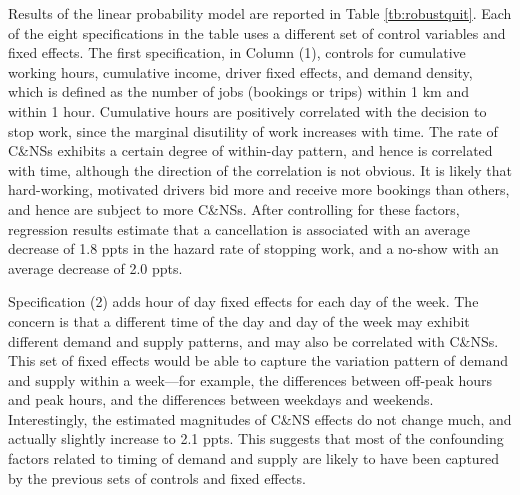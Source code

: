 \documentclass[reviewmode]{AEA}
\begin{document}
Results of the linear probability model are reported in Table \ref{tb:robustquit}. Each of the eight specifications in the table uses a different set of control variables and fixed effects. The first specification, in Column (1), controls for cumulative working hours, cumulative income, driver fixed effects, and demand density, which is defined as the number of jobs (bookings or trips) within 1 km and within 1 hour. 
Cumulative hours are positively correlated with the decision to stop work, since the marginal disutility of work increases with time. The rate of C\&NSs exhibits a certain degree of within-day pattern, and hence is correlated with time, although the direction of the correlation is not obvious. It is likely that hard-working, motivated drivers bid more and receive more bookings than others, and hence are subject to more C\&NSs. After controlling for these factors, regression results estimate that a cancellation is associated with an average decrease of 1.8 ppts in the hazard rate of stopping work, and a no-show with an average decrease of 2.0 ppts.

Specification (2) adds hour of day fixed effects for each day of the week. The concern is that a different time of the day and day of the week may exhibit different demand and supply patterns, and may also be correlated with C\&NSs. This set of fixed effects would be able to capture the variation pattern of demand and supply within a week---for example, the differences between off-peak hours and peak hours, and the differences between weekdays and weekends. Interestingly, the estimated magnitudes of C\&NS effects do not change much, and actually slightly increase to 2.1 ppts. This suggests that most of the confounding factors related to timing of demand and supply are likely to have been captured by the previous sets of controls and fixed effects. 
\end{document}
